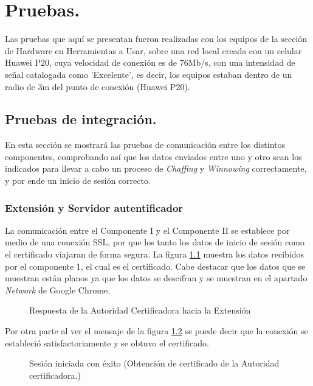 \documentclass[12pt, a4paper, titlepage]{report}
\begin{document}
	\chapter{\textcolor{azulescom}{Pruebas.}}
	    Las pruebas que aquí se presentan fueron realizadas con los equipos de la sección de Hardware en Herramientas a Usar, sobre una red local creada con un celular Huawei P20, cuya velocidad de conexión es de 76Mb/s, con una intensidad de señal catalogada como 'Excelente', es decir, los equipos estaban dentro de un radio de 3m del punto de conexión (Huawei P20). 
	   
	    \section{Pruebas de integración.}
	    
    	    En esta sección se mostrará las pruebas de comunicación entre los distintos componentes, comprobando así que los datos enviados entre uno y otro sean los indicados para llevar a cabo un proceso de \textit{Chaffing} y \textit{Winnowing} correctamente, y por ende un inicio de sesión correcto.
    	    
    	    \subsection{Extensión y Servidor autentificador}
        	    La comunicación entre el Componente I y el Componente II se establece por medio de una conexión SSL, por que los tanto los datos de inicio de sesión como el certificado viajaran de forma segura. La figura \ref{fig:WiresharkC1_C2} muestra los datos recibidos por el componente 1, el cual es el certificado. Cabe destacar que los datos que se muestran están planos ya que los datos se descifran y se muestran en el apartado \textit{Network} de Google Chrome.
    	    
        	    \begin{figure}[H]
        	        \centering
        	        
        	        \caption{Respuesta de la Autoridad Certificadora hacia la Extensión}
        	        \label{fig:WiresharkC1_C2}
    	        \end{figure}
    	    
    	        Por otra parte al ver el mensaje de la figura \ref{fig:sesionIniciadaExito} se puede decir que la conexión se estableció satisfactoriamente y se obtuvo el certificado.
    	    
        	    \begin{figure}[H]
        	        \centering 
        	        
        	        \caption{Sesión iniciada con éxito (Obtención de certificado de la Autoridad certificadora.)}    	 \label{fig:sesionIniciadaExito}
    	        \end{figure}
	        
\end{document}

